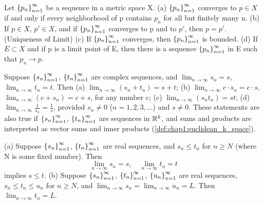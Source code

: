\begin{theorem} %
  \label{thm:chap3:convergent_props}
  Let $\left\{ p_n \right\}_{n=1}^\infty$ be a sequence in a metric space X.
  (a) $\left\{ p_n \right\}_{n=1}^\infty$ converges to $p \in X$ if and only if every
  neighborhood of p contains $p_n$ for all but finitely many n.
  (b) If $p \in X$, $p' \in X$, and if $\left\{ p_n \right\}_{n=1}^\infty$ converges to p
  and to $p'$, then $p=p'$. (Uniqueness of Limit)
  (c) If $\left\{ p_n \right\}_{n=1}^\infty$ converges, then $\left\{ p_n \right\}_{n=1}^\infty$ is bounded.
  (d) If $E \subset X$ and if p is a limit point of E, then there is
  a sequence $\left\{ p_n \right\}_{n=1}^\infty$ in E such that $p_n \to p$.
\end{theorem}

\begin{theorem} %
  \label{thm:chap3:convergence_C_Rk}
  Suppose $\left\{ s_n \right\}_{n=1}^\infty$, $\left\{ t_n \right\}_{n=1}^\infty$ are complex sequences, and
  $\lim_{n \to \infty} s_n = s$, $\lim_{n \to \infty} t_n = t$. Then
  (a) $\lim_{n \to \infty} (s_n + t_n) = s+t$;
  (b) $\lim_{n \to \infty} c \cdot s_n = c \cdot s$, $\lim_{n \to
  \infty} (c + s_n) = c + s$, for any number c;
  (c) $\lim_{n \to \infty} (s_n t_n) = st$;
  (d) $\lim_{n \to \infty} \frac{1}{s_n} = \frac{1}{s}$, provided
  $s_n \ne 0$ ($n=1, 2, 3, \dots$) and $s \ne 0$.
  These statements are also true if $\left\{ s_n \right\}_{n=1}^\infty$, $\left\{ t_n \right\}_{n=1}^\infty$
  are sequences in $\mathbb{R}^k$, and sums and products are interpreted as
  vector sums and inner products (\autoref{def:chap1:euclidean_k_space}).
\end{theorem}



\begin{theorem} %
  \label{thm:chap3:squeeze_theorem}
  (a) Suppose $\left\{ s_n \right\}_{n=1}^\infty$, $\left\{ t_n \right\}_{n=1}^\infty$ are real sequences, and
  $s_n \le t_n$ for $n \ge N$ (where N is some fixed number). Then
  \[ \lim_{n \to \infty} s_n = s, \quad \lim_{n \to \infty} t_n = t \]
  implies $s \le t$.
  (b) Suppose $\left\{ s_n \right\}_{n=1}^\infty$, $\left\{ t_n \right\}_{n=1}^\infty$, $\left\{ u_n \right\}_{n=1}^\infty$ are real
  sequences, $s_n \le t_n \le u_n$ for $n \ge N$, and $\lim_{n \to
  \infty} s_n = \lim_{n \to \infty} u_n = L$. Then $\lim_{n \to
  \infty} t_n = L$.
\end{theorem}

